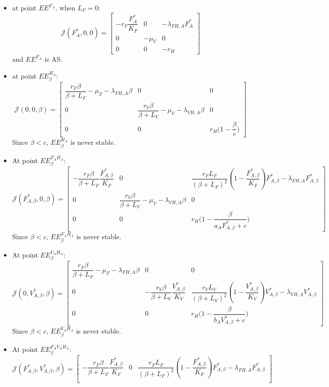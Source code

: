 \documentclass{article}
\newcommand{\lfa}{\lambda_{FH, A}}
\newcommand{\lva}{\lambda_{VH, A}}
\begin{document}
\begin{itemize}
\item at point $EE^{F_A}$, when $L_F = 0$:
\[
\mathcal{J}(F^*_A,0,0) = \begin{bmatrix}
- r_F \dfrac{F_A^*}{K_F} & 0 & -\lfa F^*_A \\ 0 &- \mu_V & 0 \\ 0 & 0 & -r_H
\end{bmatrix}
\]
and $EE^{F_A}$ is AS.
\item at point $EE^{H_A}_\beta$:
\[
\mathcal{J}(0,0,\beta) = \begin{bmatrix}
\dfrac{r_F \beta}{\beta + L_F} - \mu_F - \lfa \beta & 0 & 0 \\ 0 &\dfrac{r_V \beta}{\beta + L_V} - \mu_V - \lva \beta & 0 \\ 0 & 0 & r_H \Big(1-\dfrac{\beta}{c}\Big)
\end{bmatrix}
\]
Since $\beta < c$, $EE^{H_A}_\beta$ is never stable.
\item At point $EE^{F_AH_A}_\beta$:
\[
\mathcal{J}(F^*_{A, \beta},0,\beta) = \begin{bmatrix}
-\dfrac{r_F \beta}{\beta + L_F}\dfrac{F^*_{A, \beta}}{K_F} & 0 & \dfrac{r_F L_F}{(\beta+L_F)^2}\left(1-\dfrac{F^*_{A, \beta}}{K_F}\right)F^*_{A, \beta}  - \lfa F^*_{A, \beta} \\ 
0 &\dfrac{r_V \beta}{\beta + L_V} - \mu_V - \lva \beta & 0 \\ 
0 & 0 & r_H \Big(1-\dfrac{\beta}{a_AF^*_{A, \beta} + c}\Big)
\end{bmatrix}
\]
Since $\beta < c$, $EE^{F_AH_A}_\beta$ is never stable.
\item At point $EE^{V_AH_A}_\beta$:
\[
\mathcal{J}(0,V^*_{A, \beta},\beta) = \begin{bmatrix}
\dfrac{r_F \beta}{\beta + L_F} - \mu_F - \lfa \beta & 0 & 0\\
0 & -\dfrac{r_V \beta}{\beta + L_V}\dfrac{V^*_{A, \beta}}{K_V} & \dfrac{r_V L_V}{(\beta+L_V)^2}\left(1-\dfrac{V^*_{A, \beta}}{K_V}\right)V^*_{A, \beta}  - \lva V^*_{A, \beta} \\
0 & 0 & r_H \Big(1-\dfrac{\beta}{b_AV^*_{A, \beta} + c}\Big)
\end{bmatrix}
\]
Since $\beta < c$, $EE^{V_AH_A}_\beta$ is never stable.
\item At point $EE^{F_AV_AH_A}_\beta$:
\[
\mathcal{J}(F^*_{A, \beta},V^*_{A, \beta},\beta) = \begin{bmatrix}
-\dfrac{r_F \beta}{\beta + L_F}\dfrac{F^*_{A, \beta}}{K_F} & 0 & \dfrac{r_F L_F}{(\beta+L_F)^2}\left(1-\dfrac{F^*_{A, \beta}}{K_F}\right)F^*_{A, \beta}  - \lfa F^*_{A, \beta}\\

\end{bmatrix}\]
\end{itemize}
\end{document}
